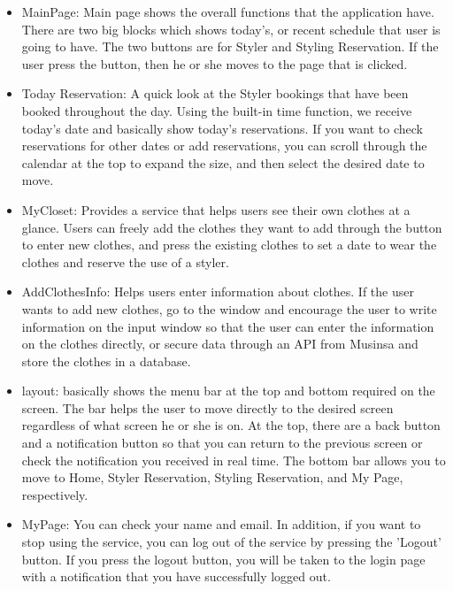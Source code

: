 \documentclass[conference]{IEEEtran}
\begin{document}
\begin{itemize}
    \item MainPage: Main page shows the overall functions that the application have. There are two big blocks which shows today's, or recent schedule that user is going to have. The two buttons are for Styler and Styling Reservation. If the user press the button, then he or she moves to the page that is clicked.\\
    
    \item Today Reservation: A quick look at the Styler bookings that have been booked throughout the day. Using the built-in time function, we receive today's date and basically show today's reservations. If you want to check reservations for other dates or add reservations, you can scroll through the calendar at the top to expand the size, and then select the desired date to move.\\
    
    \item MyCloset: Provides a service that helps users see their own clothes at a glance. Users can freely add the clothes they want to add through the button to enter new clothes, and press the existing clothes to set a date to wear the clothes and reserve the use of a styler.
    
    \item AddClothesInfo: Helps users enter information about clothes. If the user wants to add new clothes, go to the window and encourage the user to write information on the input window so that the user can enter the information on the clothes directly, or secure data through an API from Musinsa and store the clothes in a database.
    
    \item layout: basically shows the menu bar at the top and bottom required on the screen. The bar helps the user to move directly to the desired screen regardless of what screen he or she is on. At the top, there are a back button and a notification button so that you can return to the previous screen or check the notification you received in real time. The bottom bar allows you to move to Home, Styler Reservation, Styling Reservation, and My Page, respectively.
    
    \item MyPage: You can check your name and email. In addition, if you want to stop using the service, you can log out of the service by pressing the 'Logout' button. If you press the logout button, you will be taken to the login page with a notification that you have successfully logged out.
\end{itemize}
    
\end{document}
